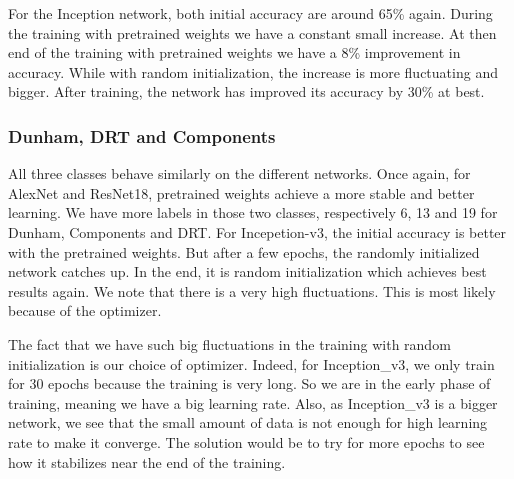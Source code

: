 For the Inception network, both initial accuracy are around 65\% again. During the training with pretrained weights we have a constant small increase. At then end of the training with pretrained weights we have a 8\% improvement in accuracy. While with random initialization, the increase is more fluctuating and bigger. After training, the network has improved its accuracy by 30\% at best.



\subsubsection{Dunham, DRT and Components}
All three classes behave similarly on the different networks. Once again, for AlexNet and ResNet18, pretrained weights achieve a more stable and better learning. We have more labels in those two classes, respectively 6, 13 and 19 for Dunham, Components and DRT. 
For Incepetion-v3, the initial accuracy is better with the pretrained weights. But after a few epochs, the randomly initialized network catches up. In the end, it is random initialization which achieves best results again. We note that there is a very high fluctuations. This is most likely because of the optimizer.

The fact that we have such big fluctuations in the training with random initialization is our choice of optimizer. Indeed, for Inception\_v3, we only train for 30 epochs because the training is very long. So we are in the early phase of training, meaning we have a big learning rate. Also, as Inception\_v3 is a bigger network, we see  that the small amount of data is not enough for high learning rate to make it converge. The solution would be to try for more epochs to see how it stabilizes near the end of the training. 


